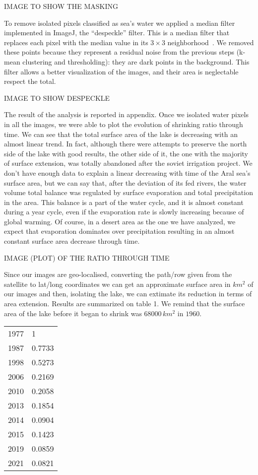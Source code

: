 IMAGE TO SHOW THE MASKING 

To remove isolated pixels classified as sea’s water we applied a median filter implemented in ImageJ, the “despeckle” filter. 
This is a median filter that replaces each pixel with the median value in its $3 \times 3$ neighborhood~\cite{despeckle}.
We removed these points because they represent a residual noise from the previous steps (k-mean clustering and thresholding): they are dark points in the background. 
This filter allows a better visualization of the images, and their area is neglectable respect the total.  

IMAGE TO SHOW DESPECKLE 

The result of the analysis is reported in appendix. 
Once we isolated water pixels in all the images, we were able to plot the evolution of shrinking ratio through time. 
We can see that the total surface area of the lake is decreasing with an almost linear trend. 
In fact, although there were attempts to preserve the north side of the lake with good results, the other side of it, the one with the majority of surface extension, was totally abandoned after the soviet irrigation project. 
We don’t have enough data to explain a linear decreasing with time of the Aral sea’s surface area, but we can say that, after the deviation of its fed rivers, the water volume total balance was regulated by surface evaporation and total precipitation in the area. 
This balance is a part of the water cycle, and it is almost constant during a year cycle, even if the evaporation rate is slowly increasing because of global warming. 
Of course, in a desert area as the one we have analyzed, we expect that evaporation dominates over precipitation resulting in an almost constant surface area decrease through time.  

IMAGE (PLOT) OF THE RATIO THROUGH TIME 

Since our images are geo-localised, converting the path/row given from the satellite to lat/long coordinates we can get an approximate surface area in $km^2$ of our images and then, isolating the lake, we can extimate its reduction in terms of area extension. 
Results are summarized on table 1. We remind that the surface area of the lake before it began to shrink was $68000\,km^2$ in $1960$.  
\begin{table}[]
\begin{tabular}{ll}
1977 & 1      \\
1987 & 0.7733 \\
1998 & 0.5273 \\
2006 & 0.2169 \\
2010 & 0.2058 \\
2013 & 0.1854 \\
2014 & 0.0904 \\
2015 & 0.1423 \\
2019 & 0.0859 \\
2021 & 0.0821
\end{tabular}
\end{table}
